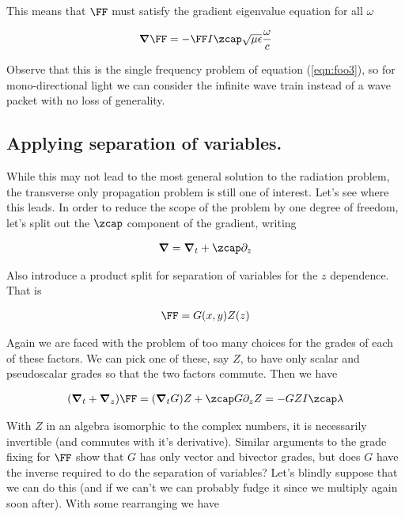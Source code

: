 This means that $\FF$ must satisfy the gradient eigenvalue equation for all $\omega$

\begin{align}\label{eqn:foob4}
\spacegrad \FF = -\FF I \zcap \sqrt{\mu\epsilon} \frac{\omega}{c} 
\end{align}

Observe that this is the single frequency problem of equation (\ref{eqn:foo3}), so for mono-directional light we can consider the infinite wave train instead of a wave packet with no loss of generality.

\subsection{Applying separation of variables.}

While this may not lead to the most general solution to the radiation problem, the transverse only propagation problem is still one of interest.  Let's see where this leads.  In order to reduce the scope of the problem by one degree of freedom, let's split out the $\zcap$ component of the gradient, writing

\begin{align}\label{eqn:fooc1}
\spacegrad = \spacegrad_t + \zcap \partial_z
\end{align}

Also introduce a product split for separation of variables for the $z$ dependence.  That is

\begin{align}\label{eqn:fooc2}
\FF = G(x,y) Z(z)
\end{align}

Again we are faced with the problem of too many choices for the grades of each of these factors.  We can pick one of these, say $Z$, to have only scalar and pseudoscalar grades so that the two factors commute.  Then we have

\begin{align*}
(\spacegrad_t + \spacegrad_z) \FF = (\spacegrad_t G) Z + \zcap G \partial_z Z = -G Z I \zcap \lambda 
\end{align*}

With $Z$ in an algebra isomorphic to the complex numbers, it is necessarily invertible (and commutes with it's derivative).  Similar arguments to the grade fixing for $\FF$ show that $G$ has only vector and bivector grades, but does $G$ have the inverse required to do the separation of variables?  Let's blindly suppose that we can do this (and if we can't we can probably fudge it since we multiply again soon after).  With some rearranging we have

